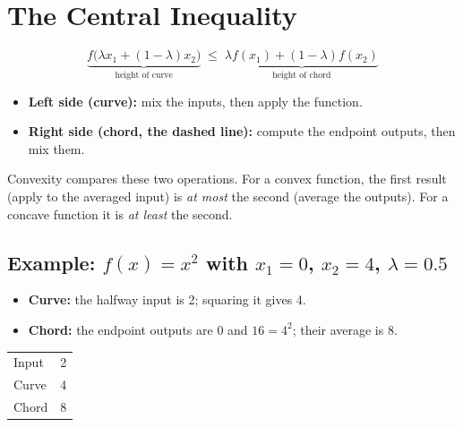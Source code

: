 \documentclass[11pt]{article}
\begin{document}
\section{The Central Inequality}

\[
    \underbrace{f\big(\lambda x_1 + (1-\lambda) x_2\big)}_{\text{height of curve}}
    \;\le\;
    \underbrace{\lambda f(x_1) + (1-\lambda) f(x_2)}_{\text{height of chord}}
\]

\begin{itemize}
    \item \textbf{Left side (curve):} mix the inputs, then apply the function.
    \item \textbf{Right side (chord, the dashed line):} compute the endpoint
          outputs, then mix them.
\end{itemize}

Convexity compares these two operations.
For a convex function, the first result (apply to the averaged input) is
\emph{at most} the second (average the outputs). For a concave function it is
\emph{at least} the second.

\subsection*{Example: $f(x) = x^2$ with $x_1 = 0$, $x_2 = 4$, $\lambda = 0.5$}

\begin{minipage}[c]{0.5\linewidth}
\begin{itemize}
    \item \textbf{Curve:} the halfway input is 2; squaring it gives 4.
    \item \textbf{Chord:} the endpoint outputs are 0 and $16 = 4^2$; their
          average is 8.
\end{itemize}
\centering
\begin{tabular}{lc}
    \toprule
    Input & 2 \\
    Curve & 4 \\
    Chord & 8 \\
    \bottomrule
\end{tabular}
\end{minipage}\hfill
\begin{minipage}[c]{0.45\linewidth}
\centering
{}
\end{minipage}
\end{document}
